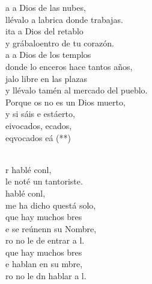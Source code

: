 \begin{cancion}%
	\begin{chorus}%
	a a Dios de las nubes,\\
	llévalo a labrica donde trabajas. \\
	ita a Dios del retablo\\
	y grábaloentro de tu corazón.\\
	a a Dios de los templos\\
	donde lo enceros hace tantos años,\\
	jalo libre en las plazas \\
	y llévalo tamén al mercado del pueblo.\\
	Porque os no es un Dios muerto,\\
	y si sáis e estáerto, \\
	eivocados, ecados,\\
	eqvocados eá (**)\\
	\end{chorus}%
	\jump\\
	r hablé conl,\\
	le noté un tantoriste.\\
	 hablé conl,\\
	me ha dicho questá solo,\\
	que hay muchos bres\\
	e se reúnenn su Nombre,\\
	ro no le de entrar a l.\\
	que hay muchos bres\\
	e hablan en su mbre,\\
	ro no le dn hablar a l.\\
\end{cancion}%

